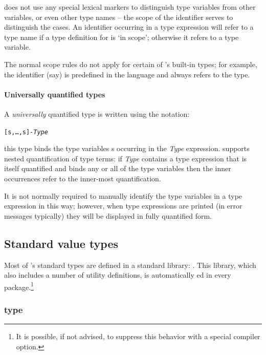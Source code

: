 \go does not use any special lexical markers to distinguish type variables from other variables, or even other type names -- the scope of the identifier serves to distinguish the cases. An identifier  occurring in a type expression will refer to a type name if a type definition for  is `in scope'; otherwise it refers to a type variable.

The normal scope rules do not apply for certain of \go's built-in types; for example, the identifier  (say) is predefined in the language and always refers to the  type.

\paragraph{Universally quantified types}
A \emph{universally} quantified type is written using the notation:
\begin{alltt}
[s,\ldots,s\subn]-\emph{Type}
\end{alltt}
this type binds the type variables s\subi{} occurring in the \emph{Type} expression. \go supports nested quantification of type terms: if \emph{Type} contains a type expression that is itself quantified and binds any or all of the  type variables then the inner occurrences refer to the inner-most quantification.

It is not normally required to manually identify the type variables in a type expression in this way; however, when type expressions are printed (in error messages typically) they will be displayed in fully quantified form.


\subsection{Standard value types}
\label{types:standard}

Most of \go's standard types are defined in a standard library: . This library, which also includes a number of utility definitions, is automatically ed in every package.\footnote{It is possible, if not advised, to suppress this behavior with a special compiler option.}

\subsubsection{ type}
\label{types:standard:thing}

